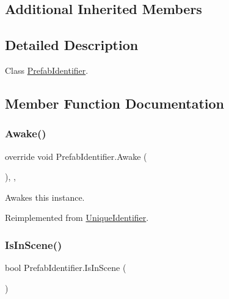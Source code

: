 \subsection*{Additional Inherited Members}


\subsection{Detailed Description}
Class \hyperlink{class_prefab_identifier}{Prefab\+Identifier}. 



\subsection{Member Function Documentation}
\mbox{\label{class_prefab_identifier_a851c02d913a5941dfbd1a472f3b3d6f3}} 
\subsubsection{\texorpdfstring{Awake()}{Awake()}}
{\footnotesize\ttfamily override void Prefab\+Identifier.\+Awake (\begin{DoxyParamCaption}{ }\end{DoxyParamCaption})\hspace{0.3cm}{\ttfamily [inline]}, {\ttfamily [protected]}, {\ttfamily [virtual]}}



Awakes this instance. 



Reimplemented from \hyperlink{class_unique_identifier_adc29ef30266f6ac51f9489ce21d0f816}{Unique\+Identifier}.

\mbox{\label{class_prefab_identifier_a30cb15dcd8a3f8ed5395a753b3ae9926}} 
\subsubsection{\texorpdfstring{Is\+In\+Scene()}{IsInScene()}}
{\footnotesize\ttfamily bool Prefab\+Identifier.\+Is\+In\+Scene (\begin{DoxyParamCaption}{ }\end{DoxyParamCaption})\hspace{0.3cm}{\ttfamily [inline]}}



